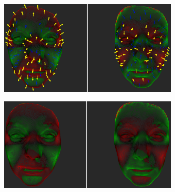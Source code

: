 \begin{figure}[h]
\centering
\begin{subfigure}{0.49\textwidth}
\includegraphics[width=\textwidth]{./screenshots/pair10.PNG}
\caption{}
\label{fig:study-3-10}
\end{subfigure}
\begin{subfigure}{0.49\textwidth}
\includegraphics[width=\textwidth]{./screenshots/pair7.PNG}
\caption{}
\label{fig:study-3-7}
\end{subfigure}


\end{figure}
